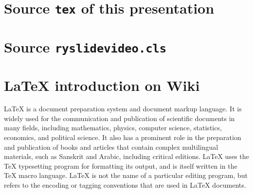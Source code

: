 \documentclass{ryslidevideo}
\begin{document}
\newpage\section{Source {\tt tex} of this presentation}
\newpage\section{Source {\tt ryslidevideo.cls}}
\newpage\section{\LaTeX{} introduction on Wiki}
\LaTeX{} is a document preparation system and document markup language.
It is widely used for the communication and publication of scientific documents in many fields,
including mathematics, physics, computer science, statistics, economics, and political science.
It also has a prominent role in the preparation and publication of books %
and articles that contain complex multilingual materials,
such as Sanskrit and Arabic, including critical editions.
\LaTeX{} uses the \TeX{} typesetting program for formatting its output,
and is itself written in the \TeX{} macro language.
\LaTeX{} is not the name of a particular editing program,
but refers to the encoding or tagging conventions that are used in \LaTeX{} documents.
\mybackcover
\end{document}

